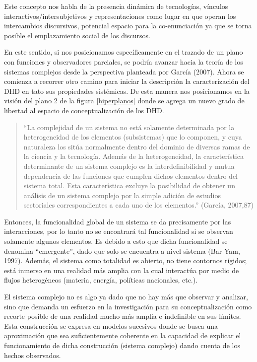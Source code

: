 Este concepto nos habla de la presencia dinámica de tecnologías, vínculos
interactivos/intersubjetivos y representaciones como lugar en que operan los
intercambios discursivos, potencial espacio para la co-enunciación ya
que se torna posible el emplazamiento social de los discursos.

En este sentido, si nos posicionamos específicamente en el trazado de
un plano con funciones y observadores parciales, se podría avanzar hacia
la teoría de los sistemas complejos desde la perspectiva planteada por
García (2007). Ahora se comienza a recorrer otro camino para iniciar la
descripción la caracterización del DHD en tato sus propiedades sistémicas.
De esta manera nos posicionamos en la visión del plano 2 de la figura
\ref{hiperplanos} donde se agrega un nuevo grado de libertad al espacio de
conceptualización de los DHD.
     
\begin{quote}
     “La complejidad de un sistema no está solamente determinada por la
     heterogeneidad de los elementos (subsistemas) que lo componen, y cuya
     naturaleza los sitúa normalmente dentro del dominio de diversas ramas de la
     ciencia y la tecnología. Además de la heterogeneidad, la característica
     determinante de un sistema complejo es la interdefinibilidad y mutua
     dependencia de las funciones que cumplen dichos elementos dentro del
     sistema total. Esta característica excluye la posibilidad de obtener
     un análisis de un sistema complejo por la simple adición de estudios
     sectoriales correspondientes a cada uno de los elementos.” (García,
     2007,87)

\end{quote} 

Entonces, la funcionalidad global de un sistema se da precisamente
por las interacciones, por lo tanto no se encontrará tal funcionalidad si se
observan solamente algunos elementos. Es debido a esto que dicha
funcionalidad se denomina “emergente”, dado que solo se encuentra a
nivel sistema (Bar-Yam, 1997). Además, el sistema como totalidad es
abierto, no tiene contornos rígidos; está inmerso en una realidad más
amplia con la cual interactúa por medio de flujos heterogéneos (materia,
energía, políticas nacionales, etc.).

El sistema complejo no es algo ya dado que no hay más que
observar y analizar, sino que demanda un esfuerzo en la investigación
para su conceptualización como recorte posible de una realidad mucho
más amplia e indefinible en sus límites. Esta construcción se expresa en
modelos  sucesivos  donde   se  busca   una   aproximación  que   sea
suficientemente coherente en la capacidad de explicar el funcionamiento
de dicha construcción (sistema complejo) dando cuenta de los hechos
observados.

